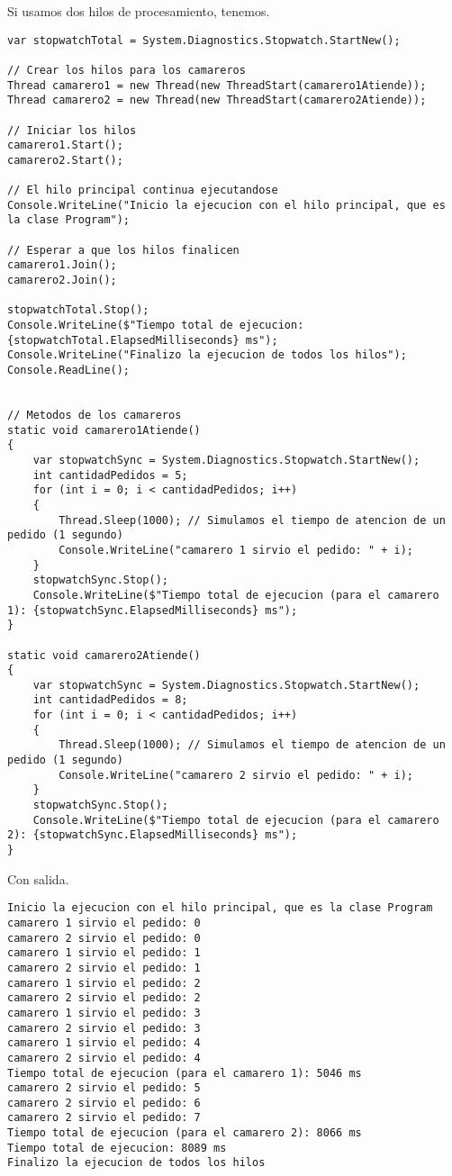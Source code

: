 \documentclass[executivepaper]{article}
\begin{document}
Si usamos dos hilos de procesamiento, tenemos.

\begin{lstlisting}
var stopwatchTotal = System.Diagnostics.Stopwatch.StartNew();

// Crear los hilos para los camareros
Thread camarero1 = new Thread(new ThreadStart(camarero1Atiende));
Thread camarero2 = new Thread(new ThreadStart(camarero2Atiende));

// Iniciar los hilos
camarero1.Start();
camarero2.Start();

// El hilo principal continua ejecutandose
Console.WriteLine("Inicio la ejecucion con el hilo principal, que es la clase Program");

// Esperar a que los hilos finalicen
camarero1.Join();
camarero2.Join();

stopwatchTotal.Stop();
Console.WriteLine($"Tiempo total de ejecucion: {stopwatchTotal.ElapsedMilliseconds} ms");
Console.WriteLine("Finalizo la ejecucion de todos los hilos");
Console.ReadLine();


// Metodos de los camareros
static void camarero1Atiende()
{
    var stopwatchSync = System.Diagnostics.Stopwatch.StartNew();
    int cantidadPedidos = 5;
    for (int i = 0; i < cantidadPedidos; i++)
    {
        Thread.Sleep(1000); // Simulamos el tiempo de atencion de un pedido (1 segundo)
        Console.WriteLine("camarero 1 sirvio el pedido: " + i);
    }
    stopwatchSync.Stop();
    Console.WriteLine($"Tiempo total de ejecucion (para el camarero 1): {stopwatchSync.ElapsedMilliseconds} ms");
}

static void camarero2Atiende()
{
    var stopwatchSync = System.Diagnostics.Stopwatch.StartNew();
    int cantidadPedidos = 8;
    for (int i = 0; i < cantidadPedidos; i++)
    {
        Thread.Sleep(1000); // Simulamos el tiempo de atencion de un pedido (1 segundo)
        Console.WriteLine("camarero 2 sirvio el pedido: " + i);
    }
    stopwatchSync.Stop();
    Console.WriteLine($"Tiempo total de ejecucion (para el camarero 2): {stopwatchSync.ElapsedMilliseconds} ms");
}    
\end{lstlisting}

Con salida.

\begin{verbatim}
Inicio la ejecucion con el hilo principal, que es la clase Program
camarero 1 sirvio el pedido: 0
camarero 2 sirvio el pedido: 0
camarero 1 sirvio el pedido: 1
camarero 2 sirvio el pedido: 1
camarero 1 sirvio el pedido: 2
camarero 2 sirvio el pedido: 2
camarero 1 sirvio el pedido: 3
camarero 2 sirvio el pedido: 3
camarero 1 sirvio el pedido: 4
camarero 2 sirvio el pedido: 4
Tiempo total de ejecucion (para el camarero 1): 5046 ms
camarero 2 sirvio el pedido: 5
camarero 2 sirvio el pedido: 6
camarero 2 sirvio el pedido: 7
Tiempo total de ejecucion (para el camarero 2): 8066 ms
Tiempo total de ejecucion: 8089 ms
Finalizo la ejecucion de todos los hilos
\end{verbatim}
\end{document}
